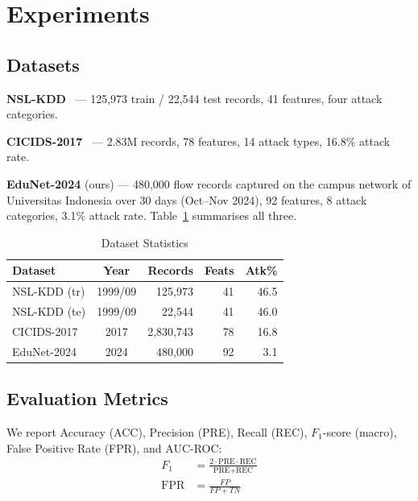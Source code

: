 \documentclass[conference]{IEEEtran}
\begin{document}
\section{Experiments}
\label{sec:experiments}

\subsection{Datasets}

\textbf{NSL-KDD}~\cite{ref:tavallaee2009} --- 125,973 train /
22,544 test records, 41 features, four attack categories.

\textbf{CICIDS-2017}~\cite{ref:sharafaldin2018} --- 2.83M records,
78 features, 14 attack types, 16.8\% attack rate.

\textbf{EduNet-2024} (ours) --- 480,000 flow records captured on
the campus network of Universitas Indonesia over 30 days (Oct--Nov
2024), 92 features, 8 attack categories, 3.1\% attack rate.
Table~\ref{tab:datasets} summarises all three.

\begin{table}[h]
	\caption{Dataset Statistics}
	\label{tab:datasets}
	\centering
	\renewcommand{\arraystretch}{1.15}
	\begin{tabular}{@{}lcrrr@{}}
		\toprule
		\textbf{Dataset} & \textbf{Year}  & \textbf{Records}
		                 & \textbf{Feats} & \textbf{Atk\%}               \\
		\midrule
		NSL-KDD (tr)     & 1999/09        & 125,973          & 41 & 46.5 \\
		NSL-KDD (te)     & 1999/09        & 22,544           & 41 & 46.0 \\
		CICIDS-2017      & 2017           & 2,830,743        & 78 & 16.8 \\
		EduNet-2024      & 2024           & 480,000          & 92 & 3.1  \\
		\bottomrule
	\end{tabular}
\end{table}

\subsection{Evaluation Metrics}

We report Accuracy (ACC), Precision (PRE), Recall (REC),
$F_1$-score (macro), False Positive Rate (FPR), and AUC-ROC:
\begin{align}
	F_1        & = \frac{2 \cdot \text{PRE} \cdot \text{REC}}
	{\text{PRE} + \text{REC}}                                 \\
	\text{FPR} & = \frac{FP}{FP + TN}
\end{align}
\end{document}
